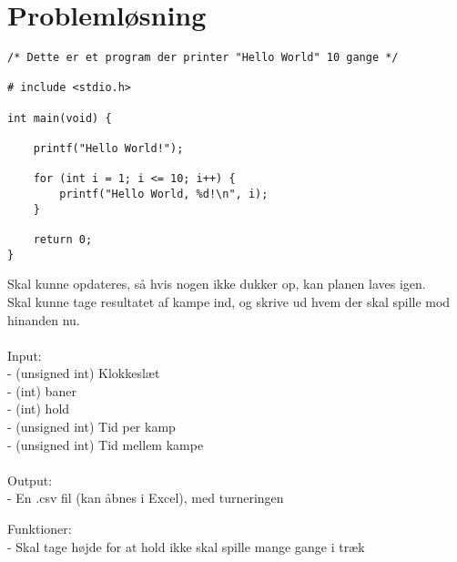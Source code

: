 \chapter{Problemløsning}\label{ch:chlabel}


\begin{verbatim}
/* Dette er et program der printer "Hello World" 10 gange */

# include <stdio.h>

int main(void) {
    
    printf("Hello World!");
    
    for (int i = 1; i <= 10; i++) {
        printf("Hello World, %d!\n", i);
    }
    
    return 0;
}
\end{verbatim}

Skal kunne opdateres, så hvis nogen ikke dukker op, kan planen laves igen.\\
Skal kunne tage resultatet af kampe ind, og skrive ud hvem der skal spille mod hinanden nu.
\\
\\
Input:\\
 - (unsigned int) Klokkeslæt\\
 - (int) baner\\
 - (int) hold\\
 - (unsigned int) Tid per kamp\\
 - (unsigned int) Tid mellem kampe\\ 
 \\
 Output: \\
  - En .csv fil (kan åbnes i Excel), med turneringen
 
Funktioner: \\
 - Skal tage højde for at hold ikke skal spille mange gange i træk\\
 